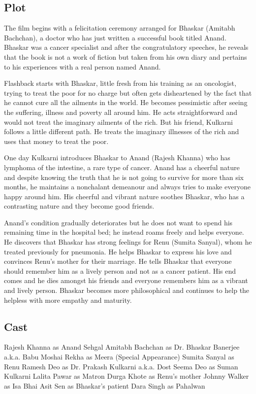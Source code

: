 \documentclass[11pt]{article}
\begin{document}
\subsection*{Plot}
The film begins with a felicitation ceremony arranged for Bhaskar (Amitabh Bachchan), a doctor who has just 
written a successful book titled Anand. Bhaskar was a cancer specialist and after the congratulatory 
speeches, he reveals that the book is not a work of fiction but taken from his own diary and pertains
to his experiences with a real person named Anand.

Flashback starts with Bhaskar, little fresh from his training as an oncologist, trying to treat the 
poor for no charge but often gets disheartened by the fact that he cannot cure all the ailments in
the world. He becomes pessimistic after seeing the suffering, illness and poverty all around him.
He acts straightforward and would not treat the imaginary ailments of the rich. But his friend,
Kulkarni follows a little different path. He treats the imaginary illnesses of the rich and uses
that money to treat the poor.

One day Kulkarni introduces Bhaskar to Anand (Rajesh Khanna) who has lymphoma of the intestine, 
a rare type of cancer. Anand has a cheerful nature and despite knowing the truth that he is not
going to survive for more than six months, he maintains a nonchalant demeanour and always tries
to make everyone happy around him. His cheerful and vibrant nature soothes Bhaskar, who has a 
contrasting nature and they become good friends.

Anand's condition gradually deteriorates but he does not want to spend his remaining time in the 
hospital bed; he instead roams freely and helps everyone. He discovers that Bhaskar has strong 
feelings for Renu (Sumita Sanyal), whom he treated previously for pneumonia. He helps Bhaskar to
express his love and convinces Renu's mother for their marriage. He tells Bhaskar that everyone
should remember him as a lively person and not as a cancer patient. His end comes and he dies 
amongst his friends and everyone remembers him as a vibrant and lively person. Bhaskar becomes
more philosophical and continues to help the helpless with more empathy and maturity.

\subsection*{Cast}
Rajesh Khanna as Anand Sehgal
Amitabh Bachchan as Dr. Bhaskar Banerjee a.k.a. Babu Moshai
Rekha as Meera (Special Appearance)
Sumita Sanyal as Renu
Ramesh Deo as Dr. Prakash Kulkarni a.k.a. Dost
Seema Deo as Suman Kulkarni
Lalita Pawar as Matron
Durga Khote as Renu's mother
Johnny Walker as Isa Bhai
Asit Sen as Bhaskar's patient
Dara Singh as Pahalwan
\end{document}
